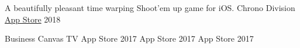 

\begin{cventries}
  \cvcompactentry
    {A beautifully pleasant time warping Shoot'em up game for iOS.}
    {Chrono Division}
    {\href{https://itunes.apple.com/app/id1437675179?mt=8}{App Store}}
    {2018}
\end{cventries}

\begin{cventries}
  \cventry
    {}
    {Business Canvas TV}
    {App Store}
    {2017}
    {}
  \cventry
    {}
    {}
    {App Store}
    {2017}
    {}
  \cventry
    {}
    {}
    {App Store}
    {2017}
    {}
\end{cventries}
